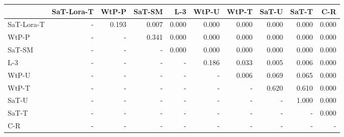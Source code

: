 \begin{tabular}{lrrrrrrrrr}
\toprule
 & SaT-Lora-T & WtP-P & SaT-SM & L-3 & WtP-U & WtP-T & SaT-U & SaT-T & C-R \\
\midrule
SaT-Lora-T & - & 0.193 & 0.007 & 0.000 & 0.000 & 0.000 & 0.000 & 0.000 & 0.000 \\
WtP-P & - & - & 0.341 & 0.000 & 0.000 & 0.000 & 0.000 & 0.000 & 0.000 \\
SaT-SM & - & - & - & 0.000 & 0.000 & 0.000 & 0.000 & 0.000 & 0.000 \\
L-3 & - & - & - & - & 0.186 & 0.033 & 0.005 & 0.006 & 0.000 \\
WtP-U & - & - & - & - & - & 0.006 & 0.069 & 0.065 & 0.000 \\
WtP-T & - & - & - & - & - & - & 0.620 & 0.610 & 0.000 \\
SaT-U & - & - & - & - & - & - & - & 1.000 & 0.000 \\
SaT-T & - & - & - & - & - & - & - & - & 0.000 \\
C-R & - & - & - & - & - & - & - & - & - \\
\bottomrule
\end{tabular}

